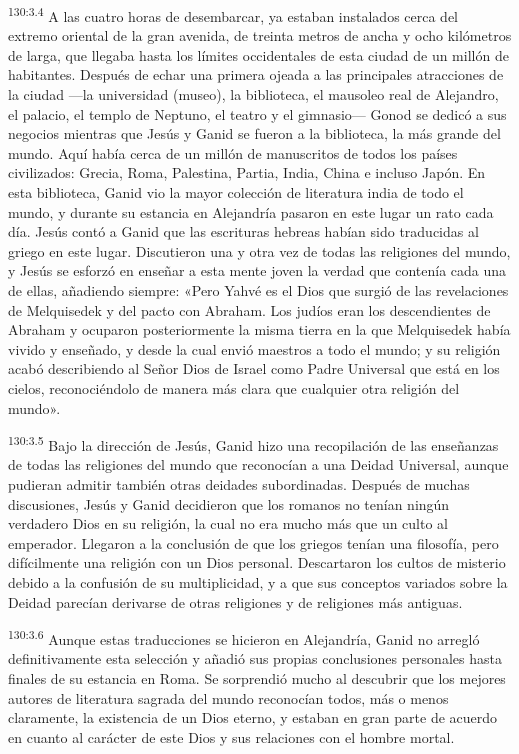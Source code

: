 \par 
\textsuperscript{130:3.4} A las cuatro horas de desembarcar, ya estaban instalados cerca del extremo oriental de la gran avenida, de treinta metros de ancha y ocho kilómetros de larga, que llegaba hasta los límites occidentales de esta ciudad de un millón de habitantes. Después de echar una primera ojeada a las principales atracciones de la ciudad ---la universidad (museo), la biblioteca, el mausoleo real de Alejandro, el palacio, el templo de Neptuno, el teatro y el gimnasio--- Gonod se dedicó a sus negocios mientras que Jesús y Ganid se fueron a la biblioteca, la más grande del mundo. Aquí había cerca de un millón de manuscritos de todos los países civilizados: Grecia, Roma, Palestina, Partia, India, China e incluso Japón. En esta biblioteca, Ganid vio la mayor colección de literatura india de todo el mundo, y durante su estancia en Alejandría pasaron en este lugar un rato cada día. Jesús contó a Ganid que las escrituras hebreas habían sido traducidas al griego en este lugar. Discutieron una y otra vez de todas las religiones del mundo, y Jesús se esforzó en enseñar a esta mente joven la verdad que contenía cada una de ellas, añadiendo siempre: «Pero Yahvé es el Dios que surgió de las revelaciones de Melquisedek y del pacto con Abraham. Los judíos eran los descendientes de Abraham y ocuparon posteriormente la misma tierra en la que Melquisedek había vivido y enseñado, y desde la cual envió maestros a todo el mundo; y su religión acabó describiendo al Señor Dios de Israel como Padre Universal que está en los cielos, reconociéndolo de manera más clara que cualquier otra religión del mundo».

\par 
\textsuperscript{130:3.5} Bajo la dirección de Jesús, Ganid hizo una recopilación de las enseñanzas de todas las religiones del mundo que reconocían a una Deidad Universal, aunque pudieran admitir también otras deidades subordinadas. Después de muchas discusiones, Jesús y Ganid decidieron que los romanos no tenían ningún verdadero Dios en su religión, la cual no era mucho más que un culto al emperador. Llegaron a la conclusión de que los griegos tenían una filosofía, pero difícilmente una religión con un Dios personal. Descartaron los cultos de misterio debido a la confusión de su multiplicidad, y a que sus conceptos variados sobre la Deidad parecían derivarse de otras religiones y de religiones más antiguas.

\par 
\textsuperscript{130:3.6} Aunque estas traducciones se hicieron en Alejandría, Ganid no arregló definitivamente esta selección y añadió sus propias conclusiones personales hasta finales de su estancia en Roma. Se sorprendió mucho al descubrir que los mejores autores de literatura sagrada del mundo reconocían todos, más o menos claramente, la existencia de un Dios eterno, y estaban en gran parte de acuerdo en cuanto al carácter de este Dios y sus relaciones con el hombre mortal.

